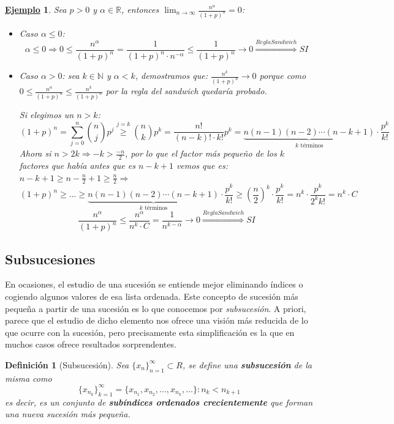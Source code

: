 \documentclass[10pt,a4paper,openright]{book}
\theoremstyle{break}
\newtheorem{defi}{Definición}[chapter]
\newtheorem{ej}{\underline{Ejemplo}}[chapter]
\begin{document}
\begin{ej}
Sea $p>0$ y $\alpha\in \mathbb R$, entonces $\lim_{n\rightarrow\infty}\frac{n^\alpha}{(1+p)^n}=0$:
\begin{itemize}
\item Caso $\alpha\leq 0$:
$$\alpha\leq 0\Rightarrow 0\leq \frac{n^\alpha}{(1+p)^n}=\frac{1}{(1+p)^n\cdot n^{-\alpha}}\leq \frac{1}{(1+p)^n}\rightarrow 0\stackrel{Regla Sandwich}{\Rightarrow} SI$$

\item Caso $\alpha>0$: sea $k\in \mathbb N$ y $\alpha<k$, demostramos que: $\frac{n^k}{(1+p)^n}\rightarrow 0$ porque como  $0\leq \frac{n^\alpha}{(1+p)^n}\leq \frac{n^k}{(1+p)^n}$ por la regla del sandwich quedaría probado.\par

Si elegimos un $n>k$:
$$(1+p)^n=\sum_{j=0}^n \binom{n}{j} p^j \stackrel{j=k}{\geq} \binom{n}{k}p^k=\frac{n!}{(n-k)!\cdot k!}p^k=\underbrace{n(n-1)(n-2)\cdots(n-k+1)}_{k \mbox{ términos}}\cdot \frac{p^k}{k!}$$
Ahora si $n>2k\Rightarrow -k>\frac{-n}{2}$, por lo que el factor más pequeño de los $k$ factores que había antes que es $n-k+1$ vemos que es: $n-k+1\geq n-\frac{n}{2}+1\geq \frac{n}{2} \Rightarrow $
$$(1+p)^n\geq ... \geq \underbrace{n(n-1)(n-2)\cdots (n-k+1)}_{k \mbox{ términos}}\cdot \frac{p^k}{k!}\geq \left(\frac{n}{2}\right)^k\cdot \frac{p^k}{k!}=n^k\cdot \frac{p^k}{2^kk!}=n^k\cdot C$$
$$\frac{n^\alpha}{(1+p)^n}\leq \frac{n^\alpha}{n^k\cdot C}=\frac{1}{n^{k-\alpha}}\rightarrow 0\stackrel{Regla Sandwich}{\Rightarrow} SI$$
\end{itemize}
\end{ej}

\subsection{Subsucesiones}
\label{sub:subsucesiones}
En ocasiones, el estudio de una sucesión se entiende mejor eliminando índices o cogiendo algunos valores de esa lista ordenada. Este concepto de sucesión más pequeña a partir de una sucesión es lo que conocemos por \textit{subsucesión}. A priori, parece que el estudio de dicho elemento nos ofrece una visión más reducida de lo que ocurre con la sucesión, pero precisamente esta simplificación es la que en muchos casos ofrece resultados sorprendentes.

\begin{defi}[Subsucesión]
Sea $\{x_n\}_{n=1}^\infty\subset R$, se define una \textbf{subsucesión} de la misma como
$$\{x_{n_k}\}_{k=1}^\infty=\{x_{n_1}, x_{n_2}, ..., x_{n_k}, ...\}: n_k<n_{k+1}$$
es decir, es un conjunto de \textbf{subíndices ordenados crecientemente} que forman una nueva sucesión más pequeña.
\end{defi}
\end{document}
